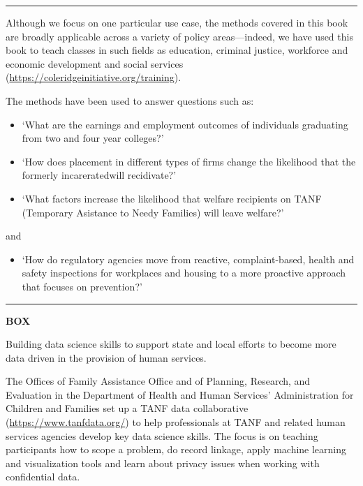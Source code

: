 \documentclass[]{krantz}
\providecommand{\tightlist}{%
  \setlength{\itemsep}{0pt}\setlength{\parskip}{0pt}}
\begin{document}
\begin{center}\rule{0.5\linewidth}{\linethickness}\end{center}

Although we focus on one particular use case, the methods covered in
this book are broadly applicable across a variety of policy
areas---indeed, we have used this book to teach classes in such fields
as education, criminal justice, workforce and economic development and
social services (\url{https://coleridgeinitiative.org/training}).

The methods have been used to answer questions such as:

\begin{itemize}
\item
  `What are the earnings and employment outcomes of individuals
  graduating from two and four year colleges?'
\item
  `How does placement in different types of firms change the likelihood
  that the formerly incareratedwill recidivate?'
\item
  `What factors increase the likelihood that welfare recipients on TANF
  (Temporary Asistance to Needy Families) will leave welfare?'
\end{itemize}

and

\begin{itemize}
\tightlist
\item
  `How do regulatory agencies move from reactive, complaint-based,
  health and safety inspections for workplaces and housing to a more
  proactive approach that focuses on prevention?'
\end{itemize}

\begin{center}\rule{0.5\linewidth}{\linethickness}\end{center}

\textbf{BOX}

Building data science skills to support state and local efforts to
become more data driven in the provision of human services.

The Offices of Family Assistance Office and of Planning, Research, and
Evaluation in the Department of Health and Human Services'
Administration for Children and Families set up a TANF data
collaborative (\url{https://www.tanfdata.org/}) to help professionals at
TANF and related human services agencies develop key data science
skills. The focus is on teaching participants how to scope a problem, do
record linkage, apply machine learning and visualization tools and learn
about privacy issues when working with confidential data.
\end{document}
